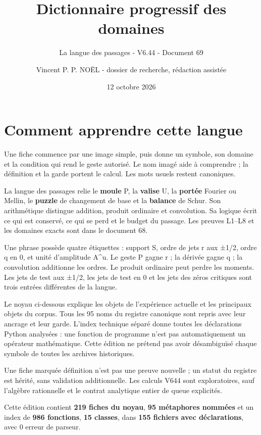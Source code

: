 \documentclass[
  9pt,
  a4paper,
]{article}
\title{Dictionnaire progressif des domaines}
\subtitle{La langue des passages - V6.44 - Document 69}
\author{Vincent P. P. NOËL - dossier de recherche, rédaction assistée}
\date{12 octobre 2026}
\begin{document}
\maketitle

{
\setcounter{tocdepth}{1}
\tableofcontents
}
\hypertarget{comment-apprendre-cette-langue}{%
\section{Comment apprendre cette
langue}\label{comment-apprendre-cette-langue}}

Une fiche commence par une image simple, puis donne un symbole, son
domaine et la condition qui rend le geste autorisé. Le nom imagé aide à
comprendre ; la définition et la garde portent le calcul. Les mots
usuels restent canoniques.

La langue des passages relie le \textbf{moule} P, la \textbf{valise} U,
la \textbf{portée} Fourier ou Mellin, le \textbf{puzzle} de changement
de base et la \textbf{balance} de Schur. Son arithmétique distingue
addition, produit ordinaire et convolution. Sa logique écrit ce qui est
conservé, ce qui se perd et le budget du passage. Les preuves L1--L8 et
les domaines exacts sont dans le document 68.

Une phrase possède quatre étiquettes : support S, ordre de jets r aux
±1/2, ordre q en 0, et unité d'amplitude A\^{}u. Le geste P gagne r ; la
dérivée gagne q ; la convolution additionne les ordres. Le produit
ordinaire peut perdre les moments. Les jets de test aux ±1/2, les jets
de test en 0 et les jets des zéros critiques sont trois entrées
différentes de la langue.

Le noyau ci-dessous explique les objets de l'expérience actuelle et les
principaux objets du corpus. Tous les 95 noms du registre canonique sont
repris avec leur ancrage et leur garde. L'index technique séparé donne
toutes les déclarations Python analysées : une fonction de programme
n'est pas automatiquement un opérateur mathématique. Cette édition ne
prétend pas avoir désambiguïsé chaque symbole de toutes les archives
historiques.

Une fiche marquée définition n'est pas une preuve nouvelle ; un statut
du registre est hérité, sans validation additionnelle. Les calculs V644
sont exploratoires, sauf l'algèbre rationnelle et le contrat analytique
entier de queue explicités.

Cette édition contient \textbf{219 fiches du noyau}, \textbf{95
métaphores nommées} et un index de \textbf{986 fonctions}, \textbf{15
classes}, dans \textbf{155 fichiers avec déclarations}, avec 0 erreur de
parseur.
\end{document}

